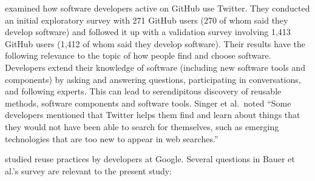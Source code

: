 \documentclass[review]{elsarticle}
\begin{document}


\citet{singer2014software} examined how software developers active on GitHub use Twitter.  They conducted an initial exploratory survey with 271 GitHub users (270 of whom said they develop software) and followed it up with a validation survey involving 1,413 GitHub users (1,412 of whom said they develop software).  Their results have the following relevance to the topic of how people find and choose software.  Developers extend their knowledge of software (including new software tools and components) by asking and answering questions, participating in conversations, and following experts.  This can lead to serendipitous discovery of reusable methods, software components and software tools.  Singer et al.\ noted ``Some developers mentioned that Twitter helps them find and learn about things that they would not have been able to search for themselves, such as emerging technologies that are too new to appear in web searches.''

\citet{bauer2014exploratory} studied reuse practices by developers at Google.  Several questions in Bauer et al.'s survey are relevant to the present study:
\end{document}

